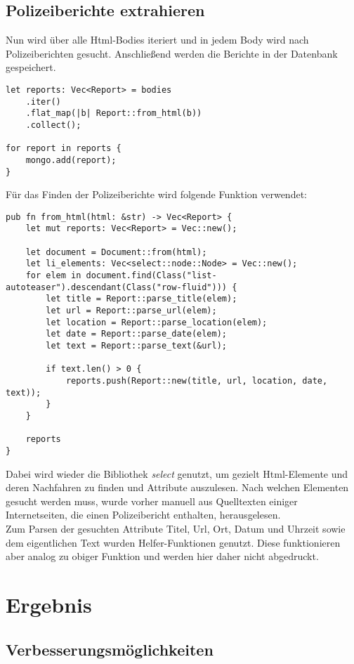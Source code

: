 \subsection{Polizeiberichte extrahieren}
Nun wird über alle Html-Bodies iteriert und in jedem Body wird nach
Polizeiberichten gesucht. Anschließend werden die Berichte in der Datenbank
gespeichert.

\begin{verbatim}
let reports: Vec<Report> = bodies
    .iter()
    .flat_map(|b| Report::from_html(b))
    .collect();

for report in reports {
    mongo.add(report);
}
\end{verbatim}

Für das Finden der Polizeiberichte wird folgende Funktion verwendet:

\begin{verbatim}
pub fn from_html(html: &str) -> Vec<Report> {
    let mut reports: Vec<Report> = Vec::new();

    let document = Document::from(html);
    let li_elements: Vec<select::node::Node> = Vec::new();
    for elem in document.find(Class("list-autoteaser").descendant(Class("row-fluid"))) {
        let title = Report::parse_title(elem);
        let url = Report::parse_url(elem);
        let location = Report::parse_location(elem);
        let date = Report::parse_date(elem);
        let text = Report::parse_text(&url);

        if text.len() > 0 {
            reports.push(Report::new(title, url, location, date, text));
        }
    }

    reports
}
\end{verbatim}

Dabei wird wieder die Bibliothek \emph{select} genutzt, um gezielt Html-Elemente
und deren Nachfahren zu finden und Attribute auszulesen. Nach welchen
Elementen gesucht werden muss, wurde vorher manuell aus Quelltexten einiger
Internetseiten, die einen Polizeibericht enthalten, herausgelesen.\\
Zum Parsen der gesuchten Attribute Titel, Url, Ort, Datum und Uhrzeit sowie
dem eigentlichen Text wurden Helfer-Funktionen genutzt. Diese funktionieren
aber analog zu obiger Funktion und werden hier daher nicht abgedruckt.

\section{Ergebnis}
\label{sec:rust_ergebnis}


\subsection{Verbesserungsmöglichkeiten}